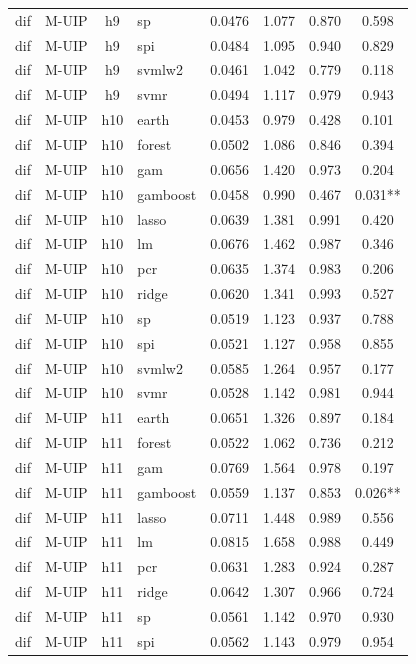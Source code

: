 \begin{ThreePartTable}
\begin{longtable}[t]{llclcccc}
dif & M-UIP & h9 & sp & 0.0476 & 1.077 & 0.870 & 0.598\\
dif & M-UIP & h9 & spi & 0.0484 & 1.095 & 0.940 & 0.829\\
dif & M-UIP & h9 & svmlw2 & 0.0461 & 1.042 & 0.779 & 0.118\\
dif & M-UIP & h9 & svmr & 0.0494 & 1.117 & 0.979 & 0.943\\
\addlinespace
dif & M-UIP & h10 & earth & 0.0453 & 0.979 & 0.428 & 0.101\\
dif & M-UIP & h10 & forest & 0.0502 & 1.086 & 0.846 & 0.394\\
dif & M-UIP & h10 & gam & 0.0656 & 1.420 & 0.973 & 0.204\\
dif & M-UIP & h10 & gamboost & 0.0458 & 0.990 & 0.467 & 0.031**\\
dif & M-UIP & h10 & lasso & 0.0639 & 1.381 & 0.991 & 0.420\\
dif & M-UIP & h10 & lm & 0.0676 & 1.462 & 0.987 & 0.346\\
dif & M-UIP & h10 & pcr & 0.0635 & 1.374 & 0.983 & 0.206\\
dif & M-UIP & h10 & ridge & 0.0620 & 1.341 & 0.993 & 0.527\\
dif & M-UIP & h10 & sp & 0.0519 & 1.123 & 0.937 & 0.788\\
dif & M-UIP & h10 & spi & 0.0521 & 1.127 & 0.958 & 0.855\\
dif & M-UIP & h10 & svmlw2 & 0.0585 & 1.264 & 0.957 & 0.177\\
dif & M-UIP & h10 & svmr & 0.0528 & 1.142 & 0.981 & 0.944\\
\addlinespace
dif & M-UIP & h11 & earth & 0.0651 & 1.326 & 0.897 & 0.184\\
dif & M-UIP & h11 & forest & 0.0522 & 1.062 & 0.736 & 0.212\\
dif & M-UIP & h11 & gam & 0.0769 & 1.564 & 0.978 & 0.197\\
dif & M-UIP & h11 & gamboost & 0.0559 & 1.137 & 0.853 & 0.026**\\
dif & M-UIP & h11 & lasso & 0.0711 & 1.448 & 0.989 & 0.556\\
dif & M-UIP & h11 & lm & 0.0815 & 1.658 & 0.988 & 0.449\\
dif & M-UIP & h11 & pcr & 0.0631 & 1.283 & 0.924 & 0.287\\
dif & M-UIP & h11 & ridge & 0.0642 & 1.307 & 0.966 & 0.724\\
dif & M-UIP & h11 & sp & 0.0561 & 1.142 & 0.970 & 0.930\\
dif & M-UIP & h11 & spi & 0.0562 & 1.143 & 0.979 & 0.954\\

\end{longtable}
\end{ThreePartTable}
